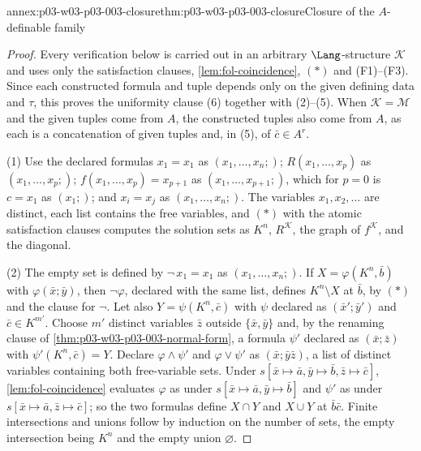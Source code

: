 \begin{annexitem}{annex:p03-w03-p03-003-closure}{thm:p03-w03-p03-003-closure}{Closure of the \(A\)-definable family}
\begin{proof}
Every verification below is carried out in an arbitrary
\(\Lang\)-structure \(\mathcal K\) and uses only the satisfaction clauses,
\cref{lem:fol-coincidence}, \((\ast)\) and (F1)--(F3).  Since each
constructed formula and tuple depends only on the given defining data and
\(\tau\), this proves the uniformity clause (6) together with (2)--(5).  When
\(\mathcal K=\mathcal M\) and the given tuples come from \(A\), the
constructed tuples also come from \(A\), as each is a concatenation of given
tuples and, in (5), of \(\bar c\in A^r\).

(1) Use the declared formulas \(x_1=x_1\) as \((x_1,\ldots,x_n;)\);
\(R(x_1,\ldots,x_p)\) as \((x_1,\ldots,x_p;)\);
\(f(x_1,\ldots,x_p)=x_{p+1}\) as \((x_1,\ldots,x_{p+1};)\), which for
\(p=0\) is \(c=x_1\) as \((x_1;)\); and \(x_i=x_j\) as
\((x_1,\ldots,x_n;)\).  The variables \(x_1,x_2,\ldots\) are distinct, each
list contains the free variables, and \((\ast)\) with the atomic
satisfaction clauses computes the solution sets as \(K^n\),
\(R^{\mathcal K}\), the graph of \(f^{\mathcal K}\), and the diagonal.

(2) The empty set is defined by \(\neg\,x_1=x_1\) as \((x_1,\ldots,x_n;)\).
If \(X=\varphi(K^n,\bar b)\) with \(\varphi(\bar x;\bar y)\), then
\(\neg\varphi\), declared with the same list, defines \(K^n\setminus X\) at
\(\bar b\), by \((\ast)\) and the clause for \(\neg\).  Let also
\(Y=\psi(K^n,\bar c)\) with \(\psi\) declared as \((\bar x';\bar y')\) and
\(\bar c\in K^{m'}\).  Choose \(m'\) distinct variables \(\bar z\) outside
\(\{\bar x,\bar y\}\) and, by the renaming clause of
\cref{thm:p03-w03-p03-003-normal-form}, a formula \(\psi'\) declared as
\((\bar x;\bar z)\) with \(\psi'(K^n,\bar c)=Y\).  Declare
\(\varphi\land\psi'\) and \(\varphi\lor\psi'\) as \((\bar x;\bar y\bar z)\),
a list of distinct variables containing both free-variable sets.  Under
\(s[\bar x\mapsto\bar a,\bar y\mapsto\bar b,\bar z\mapsto\bar c]\),
\cref{lem:fol-coincidence} evaluates \(\varphi\) as under
\(s[\bar x\mapsto\bar a,\bar y\mapsto\bar b]\) and \(\psi'\) as under
\(s[\bar x\mapsto\bar a,\bar z\mapsto\bar c]\); so the two formulas define
\(X\cap Y\) and \(X\cup Y\) at \(\bar b\bar c\).  Finite intersections and
unions follow by induction on the number of sets, the empty intersection
being \(K^n\) and the empty union \(\varnothing\).


\end{proof}
\end{annexitem}
